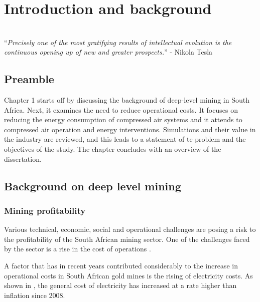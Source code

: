 \chapter{Introduction and background}  %
\thispagestyle{empty}
\vspace{40em}
\hrulefill
\\
\enquote{\textit{Precisely one of the most gratifying results of intellectual evolution is the continuous opening up of new and greater prospects.}} -  Nikola Tesla\\
\newpage

\section{Preamble}
Chapter 1 starts off by discussing the background of deep-level mining in South Africa. Next, it examines the need to reduce operational costs. It focuses on reducing the energy consumption of compressed air systems and it attends to compressed air operation and energy interventions. Simulations and their value in the industry are reviewed, and this leads to a statement of te problem and the objectives of the study. The chapter concludes with an overview of the dissertation.
\section{Background on deep level mining}
	\subsection{Mining profitability}
	
	 	Various technical, economic, social and operational challenges are posing a risk to the profitability of the South African mining sector. One of the challenges faced by the sector is a rise in the cost of operations \cite{neingo2016trends}.
	 	\par
	 	
		A factor that has in recent years contributed considerably to the increase in operational costs in South African gold mines is the rising of electricity costs. As shown in , the general cost of electricity has increased at a rate higher than inflation since 2008\footnotemark[1].
		
